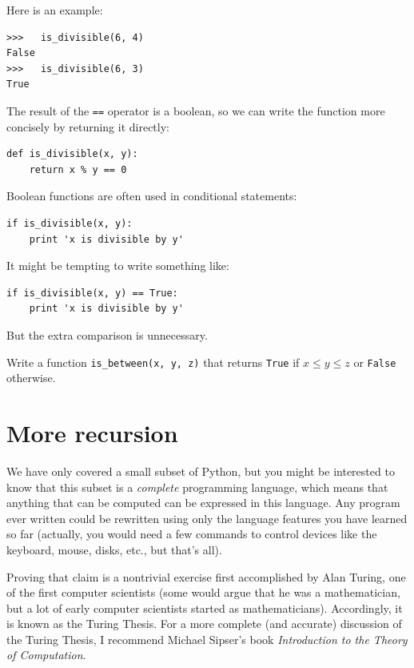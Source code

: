 \documentclass[10pt]{book}
\begin{document}
Here is an example:

\begin{verbatim}
>>>   is_divisible(6, 4)
False
>>>   is_divisible(6, 3)
True
\end{verbatim}
%
The result of the {\tt ==} operator is a boolean, so we can write the
function more concisely by returning it directly:

\begin{verbatim}
def is_divisible(x, y):
    return x % y == 0
\end{verbatim}
%
Boolean functions are often used in conditional statements:

\begin{verbatim}
if is_divisible(x, y):
    print 'x is divisible by y'
\end{verbatim}
%
It might be tempting to write something like:

\begin{verbatim}
if is_divisible(x, y) == True:
    print 'x is divisible by y'
\end{verbatim}
%
But the extra comparison is unnecessary.

\begin{exercise}

Write a function \verb"is_between(x, y, z)" that
returns {\tt True} if $x \le y \le z$ or {\tt False} otherwise.

\end{exercise}


\section{More recursion}
\label{more.recursion}

We have only covered a small subset of Python, but you might
be interested to know that this subset is a {\em complete}
programming language, which means that anything that can be
computed can be expressed in this language.  Any program ever written
could be rewritten using only the language features you have learned
so far (actually, you would need a few commands to control devices
like the keyboard, mouse, disks, etc., but that's all).

Proving that claim is a nontrivial exercise first accomplished by Alan
Turing, one of the first computer scientists (some would argue that he
was a mathematician, but a lot of early computer scientists started as
mathematicians).  Accordingly, it is known as the Turing Thesis.
For a more complete (and accurate) discussion of the Turing Thesis,
I recommend Michael Sipser's book {\em Introduction to the
Theory of Computation}.
\end{document}
